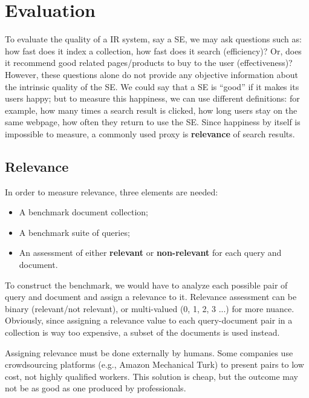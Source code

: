 \chapter{Evaluation}

To evaluate the quality of a IR system, say a SE, we may ask questions such as: how fast does it index a collection, how fast does it search (efficiency)? Or, does it recommend good related pages/products to buy to the user (effectiveness)? However, these questions alone do not provide any objective information about the intrinsic quality of the SE. We could say that a SE is ``good'' if it makes its users happy; but to measure this happiness, we can use different definitions: for example, how many times a search result is clicked, how long users stay on the same webpage, how often they return to use the SE. Since happiness by itself is impossible to measure, a commonly used proxy is \textbf{relevance} of search results.

\section{Relevance}

In order to measure relevance, three elements are needed:
\begin{itemize}
    \item A benchmark document collection;
    \item A benchmark suite of queries;
    \item An assessment of either \textbf{relevant} or \textbf{non-relevant} for each query and document.
\end{itemize}
To construct the benchmark, we would have to analyze each possible pair of query and document and assign a relevance to it. Relevance assessment can be binary (relevant/not relevant), or multi-valued (0, 1, 2, 3 ...) for more nuance. Obviously, since assigning a relevance value to each query-document pair in a collection is way too expensive, a subset of the documents is used instead.

Assigning relevance must be done externally by humans. Some companies use crowdsourcing platforms (e.g., Amazon Mechanical Turk) to present pairs to low cost, not highly qualified workers. This solution is cheap, but the outcome may not be as good as one produced by professionals. 

